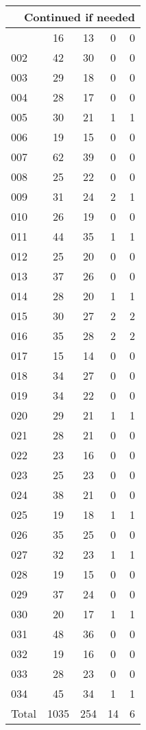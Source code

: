 \begin{center}
\begin{longtable}{l|c|c|c|c}
\hline \multicolumn{5}{|r|}{{Continued if needed}} \\ \hline
\endfoot 
001 & 16 & 13 & 0 & 0\\ \hline
002 & 42 & 30 & 0 & 0\\ \hline
003 & 29 & 18 & 0 & 0\\ \hline
004 & 28 & 17 & 0 & 0\\ \hline
005 & 30 & 21 & 1 & 1\\ \hline
006 & 19 & 15 & 0 & 0\\ \hline
007 & 62 & 39 & 0 & 0\\ \hline
008 & 25 & 22 & 0 & 0\\ \hline
009 & 31 & 24 & 2 & 1\\ \hline
010 & 26 & 19 & 0 & 0\\ \hline
011 & 44 & 35 & 1 & 1\\ \hline
012 & 25 & 20 & 0 & 0\\ \hline
013 & 37 & 26 & 0 & 0\\ \hline
014 & 28 & 20 & 1 & 1\\ \hline
015 & 30 & 27 & 2 & 2\\ \hline
016 & 35 & 28 & 2 & 2\\ \hline
017 & 15 & 14 & 0 & 0\\ \hline
018 & 34 & 27 & 0 & 0\\ \hline
019 & 34 & 22 & 0 & 0\\ \hline
020 & 29 & 21 & 1 & 1\\ \hline
021 & 28 & 21 & 0 & 0\\ \hline
022 & 23 & 16 & 0 & 0\\ \hline
023 & 25 & 23 & 0 & 0\\ \hline
024 & 38 & 21 & 0 & 0\\ \hline
025 & 19 & 18 & 1 & 1\\ \hline
026 & 35 & 25 & 0 & 0\\ \hline
027 & 32 & 23 & 1 & 1\\ \hline
028 & 19 & 15 & 0 & 0\\ \hline
029 & 37 & 24 & 0 & 0\\ \hline
030 & 20 & 17 & 1 & 1\\ \hline
031 & 48 & 36 & 0 & 0\\ \hline
032 & 19 & 16 & 0 & 0\\ \hline
033 & 28 & 23 & 0 & 0\\ \hline
034 & 45 & 34 & 1 & 1\\ \hline
\hline \hline
Total & 1035 & 254 & 14 & 6



\end{longtable}
\end{center}
 

